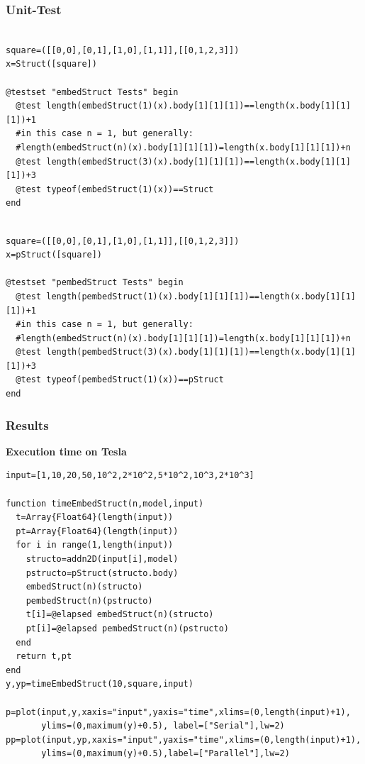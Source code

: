\documentclass[a4paper,12pt]{article}
\begin{document}
\subsubsection{Unit-Test}
\begin{Verbatim}[fontsize=\footnotesize]

square=([[0,0],[0,1],[1,0],[1,1]],[[0,1,2,3]])
x=Struct([square])	

@testset "embedStruct Tests" begin
  @test length(embedStruct(1)(x).body[1][1][1])==length(x.body[1][1][1])+1
  #in this case n = 1, but generally: 
  #length(embedStruct(n)(x).body[1][1][1])=length(x.body[1][1][1])+n
  @test length(embedStruct(3)(x).body[1][1][1])==length(x.body[1][1][1])+3
  @test typeof(embedStruct(1)(x))==Struct	
end

\end{Verbatim}

\noindent{}
\begin{Verbatim}[fontsize=\footnotesize]

square=([[0,0],[0,1],[1,0],[1,1]],[[0,1,2,3]])
x=pStruct([square])

@testset "pembedStruct Tests" begin
  @test length(pembedStruct(1)(x).body[1][1][1])==length(x.body[1][1][1])+1 
  #in this case n = 1, but generally: 
  #length(embedStruct(n)(x).body[1][1][1])=length(x.body[1][1][1])+n
  @test length(pembedStruct(3)(x).body[1][1][1])==length(x.body[1][1][1])+3
  @test typeof(pembedStruct(1)(x))==pStruct	
end

\end{Verbatim}

\newpage

\subsubsection{Results}

\textbf{Execution time on Tesla}
\begin{Verbatim}[fontsize=\footnotesize]
input=[1,10,20,50,10^2,2*10^2,5*10^2,10^3,2*10^3]

function timeEmbedStruct(n,model,input)
  t=Array{Float64}(length(input))
  pt=Array{Float64}(length(input))
  for i in range(1,length(input))
    structo=addn2D(input[i],model)
    pstructo=pStruct(structo.body)
    embedStruct(n)(structo)
    pembedStruct(n)(pstructo)
    t[i]=@elapsed embedStruct(n)(structo)
    pt[i]=@elapsed pembedStruct(n)(pstructo)
  end
  return t,pt
end
y,yp=timeEmbedStruct(10,square,input)

p=plot(input,y,xaxis="input",yaxis="time",xlims=(0,length(input)+1),
       ylims=(0,maximum(y)+0.5), label=["Serial"],lw=2)       
pp=plot(input,yp,xaxis="input",yaxis="time",xlims=(0,length(input)+1),
       ylims=(0,maximum(y)+0.5),label=["Parallel"],lw=2)
\end{Verbatim}
\vspace{25px}
\end{document}
